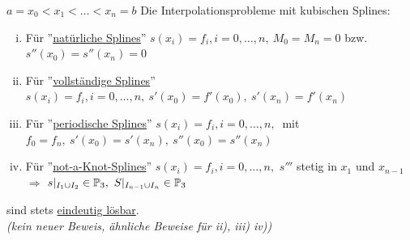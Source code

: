 \begin{theorem}
    \(a=x_0<x_1<\dots<x_n=b\) Die Interpolationsprobleme mit kubischen Splines:
    \begin{enumerate}[i)]
        \item Für ''\underline{natürliche Splines}'' \(s(x_i)=f_i, i=0,\dots,n,\ M_0=M_n=0\) bzw. \(s''(x_0)=s''(x_n)=0\)
        \item Für ''\underline{vollständige Splines}'' \(s(x_i)=f_i, i=0,\dots,n,\ s'(x_0)=f'(x_0),\ s'(x_n)=f'(x_n)\) 
        \item Für ''\underline{periodische Splines}'' \(s(x_i)=f_i, i=0,\dots,n,\ \) mit \(f_0=f_n,\ s'(x_0)=s'(x_n),\ 
        s''(x_0)=s''(x_n)\)
        \item Für ''\underline{not-a-Knot-Splines}'' \(s(x_i)=f_i, i=0,\dots,n,\) \(s'''\) stetig in \(x_1\) und 
        \(x_{n-1}\) \(\Rightarrow\) \(s\vert_{I_1\cup I_2}\in\bbP_3,\ S\vert_{I_{n-1}\cup I_n}\in\bbP_3\)
    \end{enumerate}
    sind stets \underline{eindeutig lösbar}.\\
    \textit{(kein neuer Beweis, ähnliche Beweise für ii), iii) iv))}
\end{theorem}

